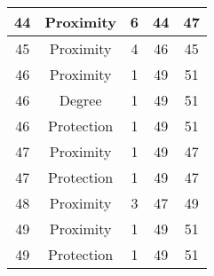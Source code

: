 \documentclass[results.tex]{subfiles}
\begin{document}
\begin{center}
\begin{tabular}{| c || c | c | c | c |}
    \hline
    44 & Proximity & 6 & 44 & 47 \\ 
    \hline
    45 & Proximity & 4 & 46 & 45 \\ 
    \hline
    46 & Proximity & 1 & 49 & 51 \\ 
    \hline
    46 & Degree & 1 & 49 & 51 \\ 
    \hline
    46 & Protection & 1 & 49 & 51 \\ 
    \hline
    47 & Proximity & 1 & 49 & 47 \\ 
    \hline
    47 & Protection & 1 & 49 & 47 \\ 
    \hline
    48 & Proximity & 3 & 47 & 49 \\ 
    \hline
    49 & Proximity & 1 & 49 & 51 \\ 
    \hline
    49 & Protection & 1 & 49 & 51 \\ 
    \hline   \end{tabular}
\end{center}
\end{document}
